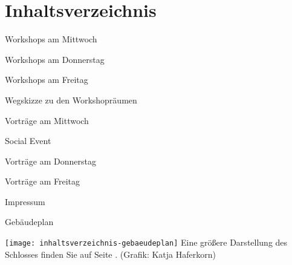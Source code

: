 \section*{Inhaltsverzeichnis}
\label{inhaltsverzeichnis}

\vspace*{0.35em}%
\noindent Workshops am Mittwoch \dotfill \pageref{mittwoch-workshops}

\vspace*{0.35em}%
\noindent Workshops am Donnerstag \dotfill \pageref{donnerstag-workshops}

\vspace*{0.35em}%
\noindent Workshops am Freitag \dotfill \pageref{freitag-workshops}


\vspace*{0.35em}%
\noindent Wegskizze zu den Workshopräumen \dotfill {}

\vspace*{0.35em}%
\noindent Vorträge am Mittwoch \dotfill \pageref{mittwoch}

\vspace*{0.35em}%
\noindent Social Event \dotfill \pageref{social-event}

\vspace*{0.35em}%
\noindent Vorträge am Donnerstag \dotfill \pageref{donnerstag}

\vspace*{0.35em}%
\noindent Vorträge am Freitag \dotfill \pageref{freitag}

\vspace*{0.35em}%
\noindent Impressum \dotfill \pageref{impressum}

\vspace*{0.35em}%
\noindent Gebäudeplan \dotfill \pageref{gebaeudeplan}

\begin{center}
	\texttt{[image: inhaltsverzeichnis-gebaeudeplan]}
\noindent Eine größere Darstellung des Schlosses finden Sie auf Seite \pageref{gebaeudeplan}.
{\small(Grafik: Katja Haferkorn) }
\end{center}